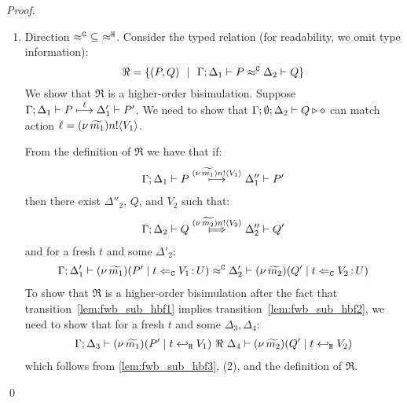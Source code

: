 \begin{proof}
\begin{enumerate}[1.]

		\item	Direction $\approx^\mathtt{C}\ \subseteq\ \approx^\mathtt{H}$.
				\noi Consider the typed relation (for readability, we omit type information):
				\[
					\Re = \{
								(P, Q) 
								\ \ |\ \ 
								\Gamma; \Delta_1 \vdash P \approx^\mathtt{C} \Delta_2 \vdash Q\}
				\]
				We show that $\Re$ is a higher-order bisimulation.
				Suppose
				$
						\Gamma; \Delta_1 \vdash P \stackrel{ \ell}{\longmapsto} \Delta_1' \vdash P'
				$.
				We need to show that $\Gamma; \emptyset; \Delta_2 \vdash Q \triangleright \diamond$
				can match action $\ell = (\nu\, \widetilde{m_1}) n ! \langle V_1 \rangle$.
				
				\smallskip

							\noi From the definition of $\Re$ we have that if:
							\begin{eqnarray}
								\Gamma; \Delta_1 \vdash P \stackrel{(\nu\, \widetilde{m_1}) n ! \langle V_1 \rangle}{\longmapsto} \Delta_1'' \vdash P'
								\label{lem:fwb_sub_hbf1}
							\end{eqnarray}
							then there exist $\Delta''_2$, $Q$, and $V_2$ such that:
							\begin{eqnarray}
								\horel{\Gamma}{\Delta_2}{Q}{\Hby{\news{\widetilde{m_2}} \bactout{n}{V_2}}}{\Delta_2''}{Q'}
								\label{lem:fwb_sub_hbf2}
							\end{eqnarray}
							and for a fresh $t$ and some $\Delta'_2$:
							\begin{eqnarray}
								\Gamma; \Delta_1' \vdash (\nu\, \widetilde{m_1})(P' \;|\; t \Leftarrow_{\mathtt{C}} V_1{\,:\,}U) \approx^\mathtt{C} \Delta_2' \vdash (\nu\, \widetilde{m_2})(Q' \;|\; t \Leftarrow_{\mathtt{C}} V_2{\,:\,}U )
								\label{lem:fwb_sub_hbf3}
							\end{eqnarray}
							\noi 
							To show that $\Re$ is a higher-order bisimulation
							after the fact that transition~\eqref{lem:fwb_sub_hbf1} implies transition~\eqref{lem:fwb_sub_hbf2},
							we need to show that for a fresh $t$ and some $\Delta_3, \Delta_4$:
							\begin{eqnarray}
								\Gamma; \Delta_3 \vdash (\nu\, \widetilde{m_1})(P' \;|\; t \hookleftarrow_{\mathtt{H}} V_1) \ \Re\  \Delta_4 \vdash (\nu\, \widetilde{m_2})(Q' \;|\; t \hookleftarrow_{\mathtt{H}} V_2)
								\label{lem:fwb_sub_hbf4}
							\end{eqnarray}
							which follows from \eqref{lem:fwb_sub_hbf3}, (2),
							and the definition of $\Re$.

	\end{enumerate}
	\qed
\end{proof}


